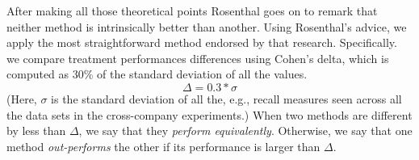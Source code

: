\documentclass[10pt,compsoc,twocolumn]{IEEEtran}
\begin{document}
  After making all those theoretical points Rosenthal goes on to remark that  neither method is intrinsically better than another.
Using Rosenthal's advice, we apply the most straightforward method endorsed by that research.   Specifically. we compare  treatment performances differences using Cohen's delta, which is computed as 30\% of the standard deviation of all the values.
\begin{equation}\label{se:cohen}
\Delta = 0.3*\sigma
\end{equation}
(Here, $\sigma$ is the standard deviation of all the, e.g., recall measures seen across all the data sets in the cross-company experiments.)
When two methods are different by less than $\Delta$, we say that they {\em  perform equivalently}. 
Otherwise,  we say that one method {\em out-performs} the other if its performance is larger than
$\Delta$.

 
 





\end{document}
